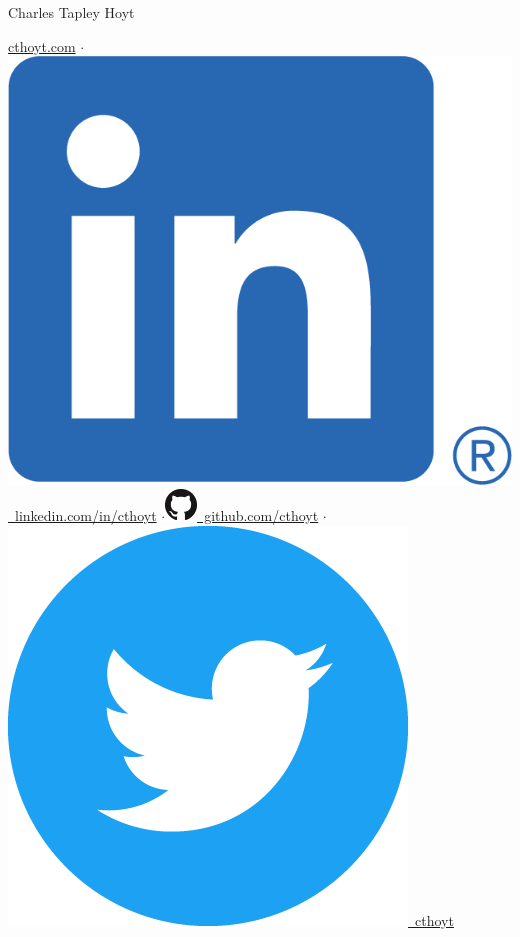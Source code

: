 \documentclass[11pt,a4paper,sans]{moderncv} %
\begin{document}
{\Huge Charles Tapley Hoyt}

\vspace{3mm}

\href{https://cthoyt.com}{cthoyt.com}
    $\cdot$\href{https://linkedin.com/in/cthoyt}{\includegraphics[scale=0.055]{img/LI-In-Bug}\
    linkedin.com/in/cthoyt}
    $\cdot$\href{https://github.com/cthoyt}{\includegraphics[scale=0.25]{img/GitHub-Mark-32px}\
    github.com/cthoyt}
    $\cdot$\href{https://twitter.com/cthoyt}{\includegraphics[scale=0.02]{img/Twitter_Social_Icon_Circle_Color}\ cthoyt}
\end{document}
